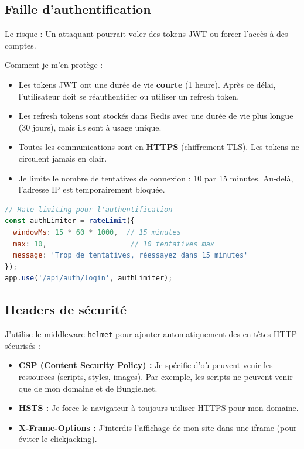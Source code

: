 \subsection{Faille d'authentification}

Le risque : Un attaquant pourrait voler des tokens JWT ou forcer l'accès à des comptes.

Comment je m'en protège :
\begin{itemize}
    \item Les tokens JWT ont une durée de vie \textbf{courte} (1 heure). Après ce délai, l'utilisateur doit se réauthentifier ou utiliser un refresh token.
    \item Les refresh tokens sont stockés dans Redis avec une durée de vie plus longue (30 jours), mais ils sont à usage unique.
    \item Toutes les communications sont en \textbf{HTTPS} (chiffrement TLS). Les tokens ne circulent jamais en clair.
    \item Je limite le nombre de tentatives de connexion : 10 par 15 minutes. Au-delà, l'adresse IP est temporairement bloquée.
\end{itemize}

\begin{lstlisting}[language=JavaScript]
// Rate limiting pour l'authentification
const authLimiter = rateLimit({
  windowMs: 15 * 60 * 1000,  // 15 minutes
  max: 10,                    // 10 tentatives max
  message: 'Trop de tentatives, réessayez dans 15 minutes'
});
app.use('/api/auth/login', authLimiter);
\end{lstlisting}

\subsection{Headers de sécurité}

J'utilise le middleware \texttt{helmet} pour ajouter automatiquement des en-têtes HTTP sécurisés :

\begin{itemize}
    \item \textbf{CSP (Content Security Policy) :} Je spécifie d'où peuvent venir les ressources (scripts, styles, images). Par exemple, les scripts ne peuvent venir que de mon domaine et de Bungie.net.
    \item \textbf{HSTS :} Je force le navigateur à toujours utiliser HTTPS pour mon domaine.
    \item \textbf{X-Frame-Options :} J'interdis l'affichage de mon site dans une iframe (pour éviter le clickjacking).
\end{itemize}

